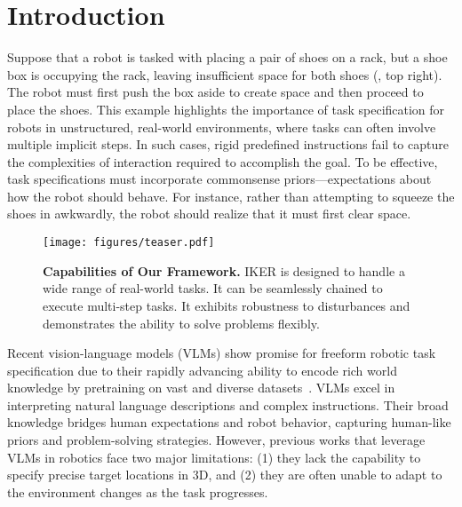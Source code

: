 \section{Introduction}


Suppose that a robot is tasked with placing a pair of shoes on a rack, but a shoe box is occupying the rack, leaving insufficient space for both shoes (, top right). The robot must first push the box aside to create space and then proceed to place the shoes. This example highlights the importance of task specification for robots in unstructured, real-world environments, where tasks can often involve multiple implicit steps. In such cases, rigid predefined instructions fail to capture the complexities of interaction required to accomplish the goal. To be effective, task specifications must incorporate commonsense priors—expectations about how the robot should behave. For instance, rather than attempting to squeeze the shoes in awkwardly, the robot should realize that it must first clear space. 


\begin{figure}[t]
    \centering
    \setlength{\abovecaptionskip}{-10pt}
    \texttt{[image: figures/teaser.pdf]}
    \captionsetup{type=figure}
    \caption{\small{\textbf{Capabilities of Our Framework.} IKER is designed to handle a wide range of real-world tasks. It can be seamlessly chained to execute multi-step tasks. It exhibits robustness to disturbances and demonstrates the ability to solve problems flexibly.}}
    \label{fig:teaser}
\end{figure}

Recent vision-language models (VLMs) show promise for freeform robotic task specification due to their rapidly advancing ability to encode rich world knowledge by pretraining on vast and diverse datasets~\cite{openai2023gpt,zeng2022socratic, radford2021learningtransferablevisualmodels, jia2021scalingvisualvisionlanguagerepresentation, li2022blip, li2023blip2bootstrappinglanguageimagepretraining, alayrac2022flamingovisuallanguagemodel, yu2022cocacontrastivecaptionersimagetext}. VLMs excel in interpreting natural language descriptions and complex instructions. Their broad knowledge bridges human expectations and robot behavior, capturing human-like priors and problem-solving strategies. However, previous works that leverage VLMs in robotics face two major limitations: (1) they lack the capability to specify precise target locations in 3D, and (2) they are often unable to adapt to the environment changes as the task progresses.


